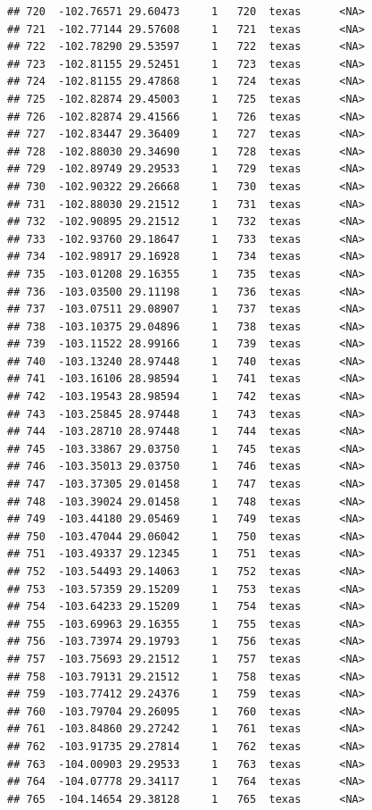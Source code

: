 \documentclass[
]{article}
\begin{document}
\begin{verbatim}
## 720  -102.76571 29.60473     1   720  texas      <NA>
## 721  -102.77144 29.57608     1   721  texas      <NA>
## 722  -102.78290 29.53597     1   722  texas      <NA>
## 723  -102.81155 29.52451     1   723  texas      <NA>
## 724  -102.81155 29.47868     1   724  texas      <NA>
## 725  -102.82874 29.45003     1   725  texas      <NA>
## 726  -102.82874 29.41566     1   726  texas      <NA>
## 727  -102.83447 29.36409     1   727  texas      <NA>
## 728  -102.88030 29.34690     1   728  texas      <NA>
## 729  -102.89749 29.29533     1   729  texas      <NA>
## 730  -102.90322 29.26668     1   730  texas      <NA>
## 731  -102.88030 29.21512     1   731  texas      <NA>
## 732  -102.90895 29.21512     1   732  texas      <NA>
## 733  -102.93760 29.18647     1   733  texas      <NA>
## 734  -102.98917 29.16928     1   734  texas      <NA>
## 735  -103.01208 29.16355     1   735  texas      <NA>
## 736  -103.03500 29.11198     1   736  texas      <NA>
## 737  -103.07511 29.08907     1   737  texas      <NA>
## 738  -103.10375 29.04896     1   738  texas      <NA>
## 739  -103.11522 28.99166     1   739  texas      <NA>
## 740  -103.13240 28.97448     1   740  texas      <NA>
## 741  -103.16106 28.98594     1   741  texas      <NA>
## 742  -103.19543 28.98594     1   742  texas      <NA>
## 743  -103.25845 28.97448     1   743  texas      <NA>
## 744  -103.28710 28.97448     1   744  texas      <NA>
## 745  -103.33867 29.03750     1   745  texas      <NA>
## 746  -103.35013 29.03750     1   746  texas      <NA>
## 747  -103.37305 29.01458     1   747  texas      <NA>
## 748  -103.39024 29.01458     1   748  texas      <NA>
## 749  -103.44180 29.05469     1   749  texas      <NA>
## 750  -103.47044 29.06042     1   750  texas      <NA>
## 751  -103.49337 29.12345     1   751  texas      <NA>
## 752  -103.54493 29.14063     1   752  texas      <NA>
## 753  -103.57359 29.15209     1   753  texas      <NA>
## 754  -103.64233 29.15209     1   754  texas      <NA>
## 755  -103.69963 29.16355     1   755  texas      <NA>
## 756  -103.73974 29.19793     1   756  texas      <NA>
## 757  -103.75693 29.21512     1   757  texas      <NA>
## 758  -103.79131 29.21512     1   758  texas      <NA>
## 759  -103.77412 29.24376     1   759  texas      <NA>
## 760  -103.79704 29.26095     1   760  texas      <NA>
## 761  -103.84860 29.27242     1   761  texas      <NA>
## 762  -103.91735 29.27814     1   762  texas      <NA>
## 763  -104.00903 29.29533     1   763  texas      <NA>
## 764  -104.07778 29.34117     1   764  texas      <NA>
## 765  -104.14654 29.38128     1   765  texas      <NA>

\end{verbatim}
\end{document}
